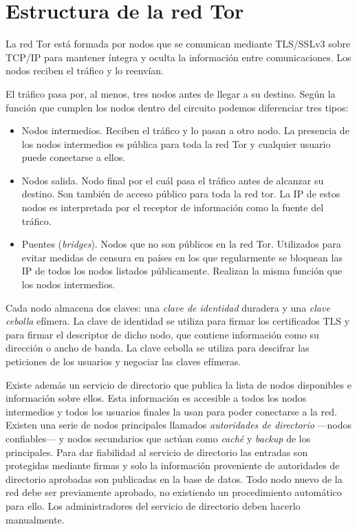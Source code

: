 \documentclass[
  a4paper,
  12pt,
  spanish,
]{scrartcl}
\begin{document}
\section{Estructura de la red Tor}
\label{sec:estructura}


La red Tor está formada por nodos que se comunican mediante TLS/SSLv3 sobre TCP/IP para mantener íntegra y oculta la información entre comunicaciones. Los nodos reciben el tráfico y lo reenvían.

El tráfico pasa por, al menos, tres nodos antes de llegar a su destino. Según la función que cumplen los nodos dentro del circuito podemos diferenciar tres tipos:

\begin{itemize}
\item Nodos intermedios. Reciben el tráfico y lo pasan a otro nodo. La presencia de los nodos intermedios es pública para toda la red Tor y cualquier usuario puede conectarse a ellos.
\item Nodos salida. Nodo final por el cuál pasa el tráfico antes de alcanzar su destino. Son también de acceso público para toda la red tor. La IP de estos nodos es interpretada por el receptor de información como la fuente del tráfico.
\item Puentes (\textit{bridges}). Nodos que no son públicos en la red Tor. Utilizados para evitar medidas de censura en países en los que regularmente se bloquean las IP de todos los nodos listados públicamente. Realizan la misma función que los nodos intermedios.
\end {itemize}

Cada nodo almacena dos claves: una \textit{clave de identidad} duradera y una \textit{clave cebolla} efímera. La clave de identidad se utiliza para firmar los certificados TLS y para firmar el descriptor de dicho nodo, que contiene información como su dirección o ancho de banda. La clave cebolla se utiliza para descifrar las peticiones de los usuarios y negociar las claves efímeras.

Existe además un servicio de directorio que publica la lista de nodos disponibles e información sobre ellos. Esta información es accesible a todos los nodos intermedios y todos los usuarios finales la usan para poder conectarse a la red. Existen una serie de nodos principales llamados \textit{autoridades de directorio} ---nodos confiables--- y nodos secundarios que actúan como \textit{caché} y \textit{backup} de los principales. Para dar fiabilidad al servicio de directorio las entradas son protegidas mediante firmas y solo la información proveniente de autoridades de directorio aprobadas son publicadas en la base de datos. Todo nodo nuevo de la red debe ser previamente aprobado, no existiendo un procedimiento automático para ello. Los administradores del servicio de directorio deben hacerlo manualmente.
\end{document}
